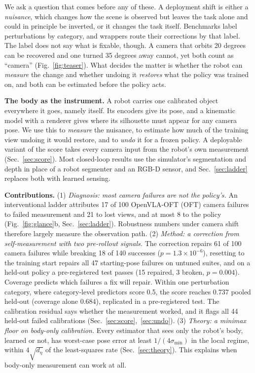 \documentclass{article}
\begin{document}
We ask a question that comes before any of these. A deployment shift is either a \emph{nuisance}, which changes how the
scene is observed but leaves the task alone and could in principle be inverted, or it changes the task itself.
Benchmarks label perturbations by category, and wrappers route their corrections by that label. The label does not say
what is fixable, though. A camera that orbits 20 degrees can be recovered and one turned 35 degrees away cannot, yet
both count as ``camera'' (Fig.~\ref{fig:teaser}). What decides the matter is whether the robot can \emph{measure} the
change and whether undoing it \emph{restores} what the policy was trained on, and both can be estimated before the
policy acts.

\textbf{The body as the instrument.} A robot carries one calibrated object everywhere it goes, namely itself. Its
encoders give its pose, and a kinematic model with a renderer gives where its silhouette must appear for any camera
pose. We use this to \emph{measure} the nuisance, to estimate how much of the training view undoing it would restore,
and to \emph{undo} it for a frozen policy. A deployable variant of the score takes every camera input from the robot's
own measurement (Sec.~\ref{sec:score}). Most closed-loop results use the simulator's segmentation and depth in place of
a robot segmenter and an RGB-D sensor, and Sec.~\ref{sec:ladder} replaces both with learned sensing.

\textbf{Contributions.}
(1) \emph{Diagnosis: most camera failures are not the policy's.} An interventional ladder attributes 17 of 100
OpenVLA-OFT (OFT) camera failures to failed measurement and 21 to lost views, and at most 8 to the policy
(Fig.~\ref{fig:glance}b, Sec.~\ref{sec:ladder}). Robustness numbers under camera shift therefore largely measure the observation path.
(2) \emph{Method: a correction from self-measurement with two pre-rollout signals.} The correction repairs 61 of 100
camera failures while breaking 18 of 140 successes ($p = 1.3\times10^{-6}$), resetting to the training start repairs
all 47 starting-pose failures on untuned suites, and on a held-out policy a pre-registered test passes (15 repaired, 3
broken, $p = 0.004$). Coverage predicts which failures a fix will repair. Within one perturbation category, where category-level predictors score 0.5, the score reaches 0.737 pooled held-out (coverage alone 0.684), replicated in a pre-registered test. The calibration residual says whether the measurement worked, and it flags all 44 held-out
failed calibrations (Sec.~\ref{sec:score},~\ref{sec:undo}).
(3) \emph{Theory: a minimax floor on body-only calibration.} Every estimator that sees only the robot's body, learned
or not, has worst-case pose error at least $1/(4\sigma_{\min})$ in the local regime, within $4\sqrt{d_\eta}$ of the
least-squares rate (Sec.~\ref{sec:theory}). This explains when body-only measurement can work at all.
\end{document}
